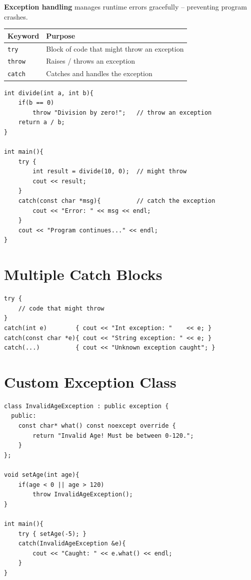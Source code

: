 \documentclass[12pt,a4paper]{report}
\begin{document}
\textbf{Exception handling} manages runtime errors gracefully -- preventing program crashes.

\begin{center}
\begin{tabular}{|l|l|}
\hline
\textbf{Keyword} & \textbf{Purpose} \\
\hline
\texttt{try}   & Block of code that might throw an exception \\
\texttt{throw} & Raises / throws an exception \\
\texttt{catch} & Catches and handles the exception \\
\hline
\end{tabular}
\end{center}

\begin{lstlisting}[caption={Basic Exception Handling}]
int divide(int a, int b){
    if(b == 0)
        throw "Division by zero!";   // throw an exception
    return a / b;
}

int main(){
    try {
        int result = divide(10, 0);  // might throw
        cout << result;
    }
    catch(const char *msg){          // catch the exception
        cout << "Error: " << msg << endl;
    }
    cout << "Program continues..." << endl;
}
\end{lstlisting}

\section{Multiple Catch Blocks}

\begin{lstlisting}[caption={Multiple catch blocks}]
try {
    // code that might throw
}
catch(int e)        { cout << "Int exception: "    << e; }
catch(const char *e){ cout << "String exception: " << e; }
catch(...)          { cout << "Unknown exception caught"; }
\end{lstlisting}

\section{Custom Exception Class}

\begin{lstlisting}[caption={Custom Exception}]
class InvalidAgeException : public exception {
  public:
    const char* what() const noexcept override {
        return "Invalid Age! Must be between 0-120.";
    }
};

void setAge(int age){
    if(age < 0 || age > 120)
        throw InvalidAgeException();
}

int main(){
    try { setAge(-5); }
    catch(InvalidAgeException &e){
        cout << "Caught: " << e.what() << endl;
    }
}
\end{lstlisting}
\end{document}
